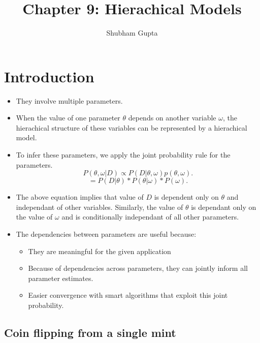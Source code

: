 \documentclass{article}
\title{Chapter 9: Hierachical Models}
\author{Shubham Gupta}
\begin{document}
    
    \maketitle

    \section{Introduction}
    
    \begin{itemize}
        \item They involve multiple parameters.
        \item When the value of one parameter $\theta$ depends on another variable  $\omega$, the hierachical structure of these variables can be represented by a hierachical model.
        \item To infer these parameters, we apply the joint probability rule for the parameters. \[
                P(\theta, \omega|D) \propto P(D|\theta, \omega) p(\theta, \omega) 
        .\] 
        \[
            = P(D|\theta) * P(\theta|\omega) * P(\omega)
        .\] 
    \item The above equation implies that value of $D$ is dependent only on  $\theta$ and independant of other variables. Similarly, the value of  $\theta$ is dependant only on the value of  $\omega$ and is conditionally independant of all other parameters.
    \item The dependencies between parameters are useful because:
        \begin{itemize}
            \item They are meaningful for the given application
            \item Because of dependencies across parameters, they can jointly inform all parameter estimates.
            \item Easier convergence with smart algorithms that exploit this joint probability.
        \end{itemize}
    \end{itemize}

    \subsection{Coin flipping from a single mint}
\end{document}
